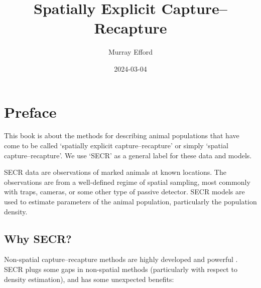 \documentclass[
]{book}
\title{Spatially Explicit Capture--Recapture}
\author{Murray Efford}
\date{2024-03-04}
\begin{document}
\maketitle

{
\setcounter{tocdepth}{1}
\tableofcontents
}
\chapter*{Preface}\label{preface}

This book is about the methods for describing animal populations that have
come to be called `spatially explicit capture--recapture' or simply `spatial
capture--recapture'. We use `SECR' as a general label for these data and models.

SECR data are observations of marked animals at known locations. The observations are from a well-defined regime of spatial sampling, most commonly with traps, cameras, or some other type of passive detector. SECR models are used to estimate parameters of the animal population,
particularly the population density.





\section*{Why SECR?}\label{why-secr}

Non-spatial capture--recapture methods are highly developed and powerful \citep{obwa78, wnc02, cw}. SECR plugs some gaps in non-spatial methods (particularly with respect to density estimation), and has some unexpected benefits:
\end{document}
